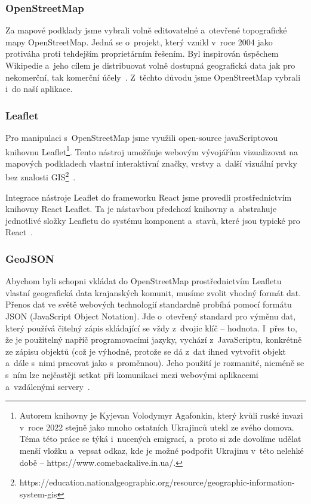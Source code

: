 \hypertarget{openstreetmap}{%
\subsubsection{OpenStreetMap}\label{openstreetmap}}

Za mapové podklady jsme vybrali volně editovatelné a~otevřené topografické mapy OpenStreetMap. Jedná se o~projekt, který vznikl v~roce 2004 jako protiváha proti tehdejším proprietárním řešením. Byl inspirován úspěchem Wikipedie a~jeho cílem je distribuovat volně dostupná geografická data jak pro nekomerční, tak komerční účely~\parencite{open-street}. Z~těchto důvodu jsme OpenStreetMap vybrali i~do naší aplikace.

\hypertarget{leaflet}{%
\subsubsection{Leaflet}\label{leaflet}}

Pro manipulaci s~OpenStreetMap jsme využili open-source javaScriptovou knihovnu Leaflet\footnote{Autorem knihovny je Kyjevan Volodymyr Agafonkin, který kvůli ruské invazi v~roce 2022 stejně jako mnoho ostatních Ukrajinců utekl ze svého domova. Téma této práce se týká i~nucených emigrací, a~proto si zde dovolíme udělat menší vložku a~vepsat odkaz, kde je možné podpořit Ukrajinu v~této nelehké době – https://www.comebackalive.in.ua/.}. Tento nástroj umožňuje webovým vývojářům vizualizovat na mapových podkladech vlastní interaktivní značky, vrstvy a~další vizuální prvky bez znalosti GIS\footnote{https://education.nationalgeographic.org/resource/geographic-information-system-gis}~\parencite{leaflet}.

Integrace nástroje Leaflet do frameworku React jsme provedli prostřednictvím knihovny React Leaflet. Ta je nástavbou předchozí knihovny a~abstrahuje jednotlivé složky Leafletu do systému komponent a~stavů, které jsou typické pro React~\parencite{react-leaflet}.

\hypertarget{geojson}{%
\subsubsection{GeoJSON}\label{geojson}}

Abychom byli schopni vkládat do OpenStreetMap prostřednictvím Leafletu vlastní geografická data krajanských komunit, musíme zvolit vhodný formát dat. Přenos dat ve světě webových technologií standardně probíhá pomocí formátu JSON (JavaScript Object Notation). Jde o~otevřený standard pro výměnu dat, který používá čitelný zápis skládající se vždy z~dvojic klíč -- hodnota. I~přes to, že je použitelný napříč programovacími jazyky, vychází z~JavaScriptu, konkrétně ze zápisu objektů (což je výhodné, protože se dá z~dat ihned vytvořit objekt a~dále s~nimi pracovat jako s~proměnnou). Jeho použití je rozmanité, nicméně se s~ním lze nejčastěji setkat při komunikaci mezi webovými aplikacemi a~vzdálenými servery~\parencite{json}.

